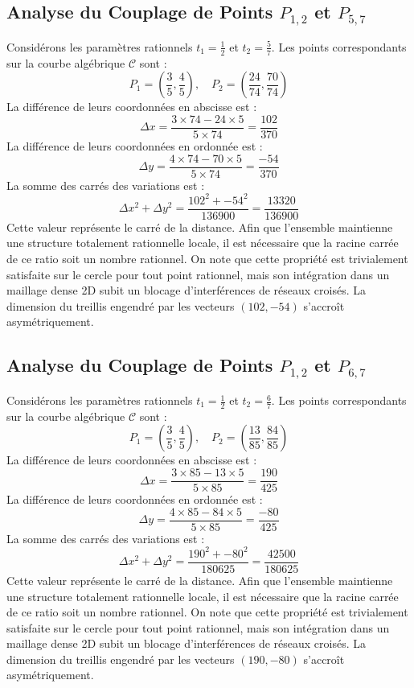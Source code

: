 \documentclass[12pt, a4paper]{article}
\begin{document}
\subsection{Analyse du Couplage de Points $P_{1,2}$ et $P_{5,7}$}
Considérons les paramètres rationnels $t_1 = \frac{1}{2}$ et $t_2 = \frac{5}{7}$.
Les points correspondants sur la courbe algébrique $\mathcal{C}$ sont :
$$ P_1 = \left( \frac{3}{5}, \frac{4}{5} \right), \quad P_2 = \left( \frac{24}{74}, \frac{70}{74} \right) $$
La différence de leurs coordonnées en abscisse est :
$$ \Delta x = \frac{3 \times 74 - 24 \times 5}{5 \times 74} = \frac{102}{370} $$
La différence de leurs coordonnées en ordonnée est :
$$ \Delta y = \frac{4 \times 74 - 70 \times 5}{5 \times 74} = \frac{-54}{370} $$
La somme des carrés des variations est :
$$ \Delta x^2 + \Delta y^2 = \frac{ 102^2 + -54^2 }{ 136900 } = \frac{ 13320 }{ 136900 } $$
Cette valeur représente le carré de la distance. Afin que l'ensemble maintienne une structure totalement rationnelle locale, il est nécessaire que la racine carrée de ce ratio soit un nombre rationnel. On note que cette propriété est trivialement satisfaite sur le cercle pour tout point rationnel, mais son intégration dans un maillage dense 2D subit un blocage d'interférences de réseaux croisés. La dimension du treillis engendré par les vecteurs $( 102, -54 )$ s'accroît asymétriquement.


\subsection{Analyse du Couplage de Points $P_{1,2}$ et $P_{6,7}$}
Considérons les paramètres rationnels $t_1 = \frac{1}{2}$ et $t_2 = \frac{6}{7}$.
Les points correspondants sur la courbe algébrique $\mathcal{C}$ sont :
$$ P_1 = \left( \frac{3}{5}, \frac{4}{5} \right), \quad P_2 = \left( \frac{13}{85}, \frac{84}{85} \right) $$
La différence de leurs coordonnées en abscisse est :
$$ \Delta x = \frac{3 \times 85 - 13 \times 5}{5 \times 85} = \frac{190}{425} $$
La différence de leurs coordonnées en ordonnée est :
$$ \Delta y = \frac{4 \times 85 - 84 \times 5}{5 \times 85} = \frac{-80}{425} $$
La somme des carrés des variations est :
$$ \Delta x^2 + \Delta y^2 = \frac{ 190^2 + -80^2 }{ 180625 } = \frac{ 42500 }{ 180625 } $$
Cette valeur représente le carré de la distance. Afin que l'ensemble maintienne une structure totalement rationnelle locale, il est nécessaire que la racine carrée de ce ratio soit un nombre rationnel. On note que cette propriété est trivialement satisfaite sur le cercle pour tout point rationnel, mais son intégration dans un maillage dense 2D subit un blocage d'interférences de réseaux croisés. La dimension du treillis engendré par les vecteurs $( 190, -80 )$ s'accroît asymétriquement.
\end{document}
